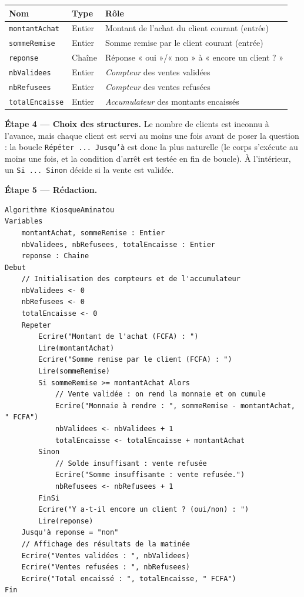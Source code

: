 \documentclass[11pt]{article}
\begin{document}
\begin{center}
\begin{tabularx}{\linewidth}{|l|l|X|}
\hline
\rowcolor{popblueL} \textbf{Nom} & \textbf{Type} & \textbf{Rôle} \\
\hline
\texttt{montantAchat} & Entier & Montant de l'achat du client courant (entrée) \\
\hline
\texttt{sommeRemise} & Entier & Somme remise par le client courant (entrée) \\
\hline
\texttt{reponse} & Chaîne & Réponse « oui »/« non » à « encore un client ? » \\
\hline
\texttt{nbValidees} & Entier & \emph{Compteur} des ventes validées \\
\hline
\texttt{nbRefusees} & Entier & \emph{Compteur} des ventes refusées \\
\hline
\texttt{totalEncaisse} & Entier & \emph{Accumulateur} des montants encaissés \\
\hline
\end{tabularx}
\end{center}

\textbf{Étape 4 — Choix des structures.} Le nombre de clients est inconnu à l'avance, mais chaque client est servi au moins une fois avant de poser la question : la boucle \texttt{Répéter ... Jusqu'à} est donc la plus naturelle (le corps s'exécute au moins une fois, et la condition d'arrêt est testée en fin de boucle). À l'intérieur, un \texttt{Si ... Sinon} décide si la vente est validée.

\textbf{Étape 5 — Rédaction.}

\begin{lstlisting}
Algorithme KiosqueAminatou
Variables
    montantAchat, sommeRemise : Entier
    nbValidees, nbRefusees, totalEncaisse : Entier
    reponse : Chaine
Debut
    // Initialisation des compteurs et de l'accumulateur
    nbValidees <- 0
    nbRefusees <- 0
    totalEncaisse <- 0
    Repeter
        Ecrire("Montant de l'achat (FCFA) : ")
        Lire(montantAchat)
        Ecrire("Somme remise par le client (FCFA) : ")
        Lire(sommeRemise)
        Si sommeRemise >= montantAchat Alors
            // Vente validée : on rend la monnaie et on cumule
            Ecrire("Monnaie à rendre : ", sommeRemise - montantAchat, " FCFA")
            nbValidees <- nbValidees + 1
            totalEncaisse <- totalEncaisse + montantAchat
        Sinon
            // Solde insuffisant : vente refusée
            Ecrire("Somme insuffisante : vente refusée.")
            nbRefusees <- nbRefusees + 1
        FinSi
        Ecrire("Y a-t-il encore un client ? (oui/non) : ")
        Lire(reponse)
    Jusqu'à reponse = "non"
    // Affichage des résultats de la matinée
    Ecrire("Ventes validées : ", nbValidees)
    Ecrire("Ventes refusées : ", nbRefusees)
    Ecrire("Total encaissé : ", totalEncaisse, " FCFA")
Fin
\end{lstlisting}
\end{document}
